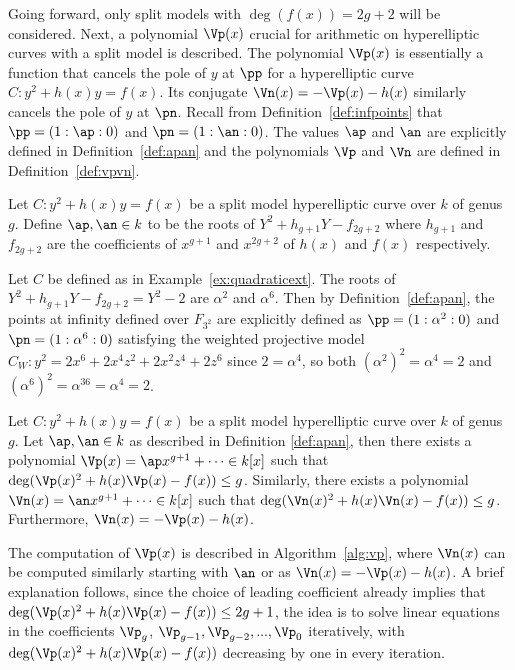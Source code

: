 Going forward, only split models with $\deg(f(x)) = 2g + 2$ will be considered.
Next, a polynomial $\Vp(x)$ crucial for arithmetic on hyperelliptic curves with
a split model is described. The polynomial $\Vp(x)$ is essentially a function
that cancels the pole of $y$ at $\pp$ for a hyperelliptic curve $C : y^2 + h(x)y
= f(x)$. Its conjugate $\Vn(x) = -\Vp(x) - h(x)$ similarly cancels the pole of
$y$ at $\pn$. Recall from Definition~\ref{def:infpoints} that $\pp = (1:\ap:0)$
and $\pn = (1:\an:0)$. The values $\ap$ and $\an$ are explicitly defined in
Definition~\ref{def:apan} and the polynomials $\Vp$ and $\Vn$ are defined in
Definition~\ref{def:vpvn}.

\bd \label{def:apan} \cite[Adapted from Excercise~10.1.28]{Galbraith_PKC_2012}
Let $C : y^2 + h(x)y = f(x)$ be a split model hyperelliptic curve over $k$ of
genus $g$. Define $\ap, \an \in k$ to be the roots of $Y^2 + h_{g+1}Y - f_{2g +
2}$ where $h_{g+1}$ and $f_{2g + 2}$ are the coefficients of $x^{g+1}$ and
$x^{2g +2}$ of $h(x)$ and $f(x)$ respectively.
\ed

\be
Let $C$ be defined as in Example~\ref{ex:quadraticext}. The roots of $Y^2 +
h_{g+1}Y - f_{2g + 2} = Y^2 - 2$ are $\alpha^2$ and $\alpha^6$. Then by
Definition~\ref{def:apan}, the points at infinity defined over $F_{3^2}$ are
explicitly defined as $\pp = (1 : \alpha^2 : 0)$ and $\pn = (1 : \alpha^6 :0)$
satisfying the weighted projective model $C_W : y^2 = 2x^6 + 2x^4z^2 + 2x^2z^4 +
2z^6$ since $2 = \alpha^4$, so both $(\alpha^2)^2 = \alpha^4 = 2$ and
$(\alpha^6)^2 = \alpha^{36} = \alpha^4 = 2$.
\ee

\bd \label{def:vpvn} \cite[Adapted from Excercise~10.1.28]{Galbraith_PKC_2012}
Let $C : y^2 + h(x)y = f(x)$ be a split model hyperelliptic curve over $k$ of
genus $g$. Let $\ap, \an \in k$ as described in Definition \ref{def:apan}, then
there exists a polynomial $ \Vp(x) =\ap x^{g+1} + \cdots \in k[x]$ such that
$\deg(\Vp(x)^2 + h(x)\Vp(x) - f(x)) \leq g$. Similarly, there exists a
polynomial $\Vn(x) =\an x^{g+1} + \cdots \in k[x]$ such that $\deg(\Vn(x)^2 +
h(x)\Vn(x) - f(x)) \leq g$. Furthermore, $\Vn(x) = -\Vp(x) - h(x)$.
\ed

The computation of $\Vp(x)$ is described in Algorithm~\ref{alg:vp},
where $\Vn(x)$ can be computed similarly starting with $\an$ or as $\Vn(x) =
-\Vp(x) - h(x)$. A brief explanation follows, since the choice of leading
coefficient already implies that $\deg(\Vp(x)^2 + h(x)\Vp(x) - f(x)) \leq 2g +
1$, the idea is to solve linear equations in the coefficients $\Vp_{g}$,
$\Vp_{g-1}, \Vp_{g-2}, ...,\Vp_{0}$ iteratively, with $\deg(\Vp(x)^2 +
h(x)\Vp(x) - f(x))$ decreasing by one in every iteration. 

